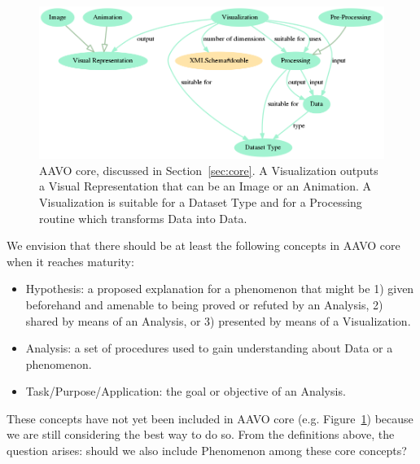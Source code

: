 \documentclass[12pt,fleqn]{article}
\begin{document}
\begin{figure}[!htbp] %
\vspace{-2pt}
\begin{center}
\includegraphics[width=\textwidth]{../figs/aavo0.01_minimum}
	\caption{AAVO core, discussed in Section~\ref{sec:core}.
	A Visualization outputs a Visual Representation that can be an Image or an Animation.
	A Visualization is suitable for a Dataset Type and for a Processing routine which transforms
	Data into Data.}
\label{fig:minimum}%
\end{center}
\end{figure}

We envision that there should be at least the following concepts in
AAVO core when it reaches maturity:
\begin{itemize}
	\item Hypothesis: a proposed explanation for a phenomenon that might be
		1) given beforehand and amenable to being proved or refuted by an Analysis,
		2) shared by means of an Analysis,
		or 3) presented by means of a Visualization.
	\item Analysis: a set of procedures used to gain understanding about
		Data or a phenomenon.
	\item Task/Purpose/Application: the goal or objective of an Analysis.
\end{itemize}
\noindent These concepts have not yet been included in AAVO core (e.g. Figure~\ref{fig:minimum})
because we are still considering the best way to do so.
From the definitions above,  the question arises:
should we also include Phenomenon among these core concepts?
\end{document}
